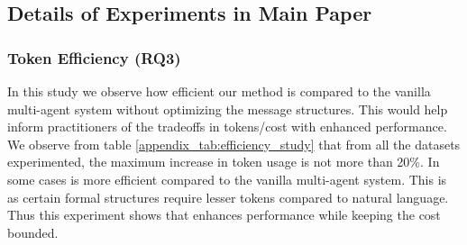 \subsection{Details of Experiments in Main Paper}\label{appendix_detailed_experiments}
\subsubsection{Token Efficiency (RQ3)}\label{apndx_efficiency}
In this study we observe how efficient our method is compared to the vanilla multi-agent system without optimizing the message structures. This would help inform practitioners of the tradeoffs in tokens/cost with enhanced performance. We observe from table \ref{appendix_tab:efficiency_study} that from all the datasets experimented, the maximum increase in token usage is not more than 20\%. In some cases \method is more efficient compared to the vanilla multi-agent system. This is as certain formal structures require lesser tokens compared to natural language. Thus this experiment shows that \method enhances performance while keeping the cost bounded.

\begin{table}[h!]
  \caption{Token efficiency of \method.} 
    \label{appendix_tab:efficiency_study}
    \centering
\end{table}

